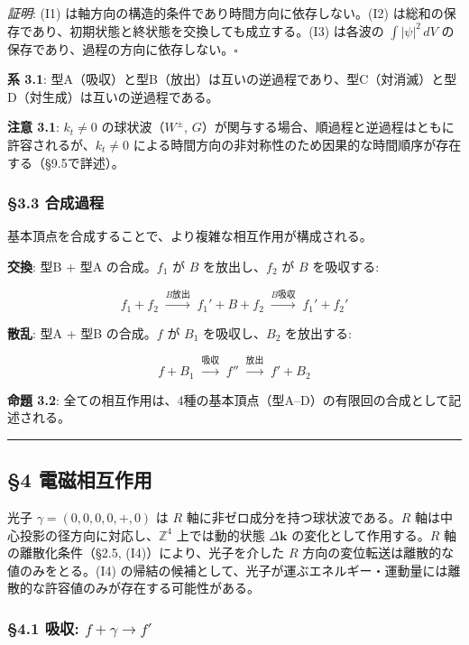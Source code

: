 \documentclass[
  a4paper,11pt]{ltjsarticle}
\theoremstyle{definition}
\theoremstyle{remark}
\begin{document}
\emph{証明}: (I1) は軸方向の構造的条件であり時間方向に依存しない。(I2)
は総和の保存であり、初期状態と終状態を交換しても成立する。(I3) は各波の
\(\int |\psi|^2 \, dV\)
の保存であり、過程の方向に依存しない。\(\square\)

\textbf{系 3.1}:
型A（吸収）と型B（放出）は互いの逆過程であり、型C（対消滅）と型D（対生成）は互いの逆過程である。

\textbf{注意 3.1}: \(k_t \neq 0\) の球状波（\(W^{\pm}\),
\(G\)）が関与する場合、順過程と逆過程はともに許容されるが、\(k_t \neq 0\)
による時間方向の非対称性のため因果的な時間順序が存在する（§9.5で詳述）。

\subsubsection{§3.3 合成過程}\label{ux5408ux6210ux904eux7a0b}

基本頂点を合成することで、より複雑な相互作用が構成される。

\textbf{交換}: 型B + 型A の合成。\(f_1\) が \(B\) を放出し、\(f_2\) が
\(B\) を吸収する:

\[f_1 + f_2 \;\xrightarrow{B\text{放出}}\; f_1' + B + f_2 \;\xrightarrow{B\text{吸収}}\; f_1' + f_2'\]

\textbf{散乱}: 型A + 型B の合成。\(f\) が \(B_1\) を吸収し、\(B_2\)
を放出する:

\[f + B_1 \;\xrightarrow{\text{吸収}}\; f'' \;\xrightarrow{\text{放出}}\; f' + B_2\]

\textbf{命題 3.2}:
全ての相互作用は、4種の基本頂点（型A--D）の有限回の合成として記述される。

\begin{center}\rule{0.5\linewidth}{0.5pt}\end{center}

\subsection{§4 電磁相互作用}\label{ux96fbux78c1ux76f8ux4e92ux4f5cux7528}

光子 \(\gamma = (0, 0, 0, 0, +, 0)\) は \(R\)
軸に非ゼロ成分を持つ球状波である。\(R\)
軸は中心投影の径方向に対応し、\(\mathbb{Z}^4\) 上では動的状態
\(\Delta\mathbf{k}\) の変化として作用する。\(R\) 軸の離散化条件（§2.5,
(I4)）により、光子を介した \(R\)
方向の変位転送は離散的な値のみをとる。(I4)
の帰結の候補として、光子が運ぶエネルギー・運動量には離散的な許容値のみが存在する可能性がある。

\subsubsection{\texorpdfstring{§4.1 吸収:
\(f + \gamma \to f'\)}{§4.1 吸収: f + \textbackslash gamma \textbackslash to f\textquotesingle{}}}\label{ux5438ux53ce-f-gamma-to-f}
\end{document}
